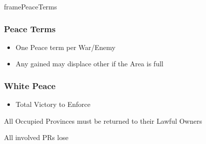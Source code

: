 \documentclass[10pt]{article}
\newlength{\fhPeaceTerms} \setlength\fhPeaceTerms{45.5\baselineskip}
\begin{document}
\begin{dynamiccontents*}{framePeaceTerms}\begin{eubox}{\fhPeaceTerms}
	\begin{multicols}{3}
		\subsubsection*{Peace Terms }
		\begin{itemize}
			\item One Peace term per War/Enemy
			\item Any gained \influence may displace other \influence if the Area is full
		\end{itemize}

		\subsubsection*{White Peace}
		\begin{itemize}
			{
				\color{peaceReqColor}
				\item {}
				\begin{itemize}
					\item Total Victory to Enforce
				\end{itemize}
			}
			\item All Occupied Provinces must be returned to their Lawful Owners
			\item All involved PRs lose 
		\end{itemize}


\end{multicols}
\end{eubox}
\end{dynamiccontents*}
\end{document}

